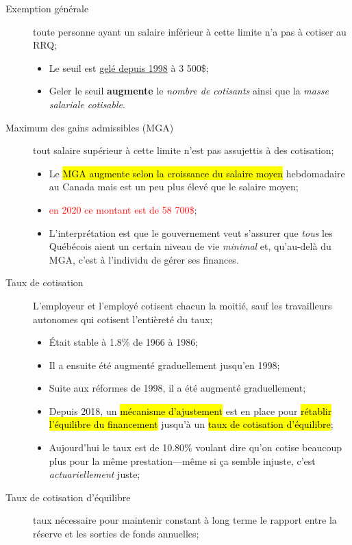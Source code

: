 \documentclass[10pt, french]{article}
\begin{document}
\begin{multicols*}{3}
\begin{description}
	\item[Exemption générale]	toute personne ayant un salaire inférieur à cette limite n'a pas à cotiser au RRQ;
		\begin{itemize}[leftmargin = *]
			\item	Le seuil est \hyperlink{seuil_link}{\textcolor{blue_rectangle}{gelé depuis 1998}} à 3 500\$;
			\item	Geler le seuil \textbf{augmente} le \textit{nombre de cotisants} ainsi que la \textit{masse salariale cotisable}.
		\end{itemize}
	\item[Maximum des gains admissibles (MGA)] tout salaire supérieur à cette limite n'est pas assujettis à des cotisation;
		\begin{itemize}[leftmargin = *]
			\item	Le \hl{MGA augmente selon la croissance du salaire moyen} hebdomadaire au Canada mais est un peu plus élevé que le salaire moyen;
			\item	\textcolor{red}{en 2020 ce montant est de 58 700\$};
			\item	L’interprétation est que le gouvernement veut s’assurer que \textit{tous} les Québécois aient un certain niveau de vie \textit{minimal} et, qu’au-delà du MGA, c’est à l’individu de gérer ses finances.
		\end{itemize}
	\item[Taux de cotisation]	L'employeur et l'employé cotisent chacun la moitié, sauf les travailleurs autonomes qui cotisent l'entièreté du taux;
		\begin{itemize}[leftmargin = *]
			\item	Était stable à 1.8\% de 1966 à 1986;
			\item	Il a ensuite été augmenté graduellement jusqu'en 1998;
			\item	Suite aux réformes de 1998, il a été augmenté graduellement;
			\item	Depuis 2018, un \hl{mécanisme d'ajustement} est en place pour \hl{rétablir l'équilibre du financement} jusqu'à un \hl{taux de cotisation d'équilibre};
			\item	Aujourd'hui le taux est de 10.80\% voulant dire qu'on cotise beaucoup plus pour la même prestation---même si ça semble injuste, c'est \textit{actuariellement} juste;
		\end{itemize}
	\item[Taux de cotisation d'équilibre]	taux nécessaire pour maintenir constant à long terme le rapport entre la réserve et les sorties de fonds annuelles;

\end{description}
\end{multicols*}
\end{document}
